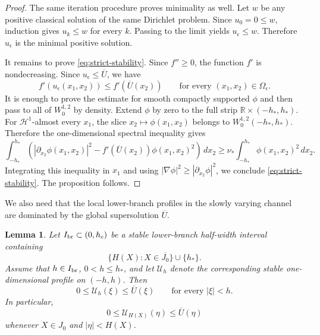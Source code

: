 \documentclass[reqno,12pt]{amsart}
\numberwithin{equation}{section}
\newtheorem{lemma}[theorem]{Lemma}
\theoremstyle{remark}
\begin{document}
\begin{proof}
The same iteration procedure proves minimality as well. Let $w$ be any positive classical
solution of the same Dirichlet problem. Since $u_0=0\le w$, induction gives
$u_k\le w$ for every $k$. Passing to the limit yields
$u_\epsilon\le w$. Therefore $u_\epsilon$ is the minimal positive solution.

It remains to prove \eqref{eq:strict-stability}. Since $f''\ge0$, the function
$f'$ is nondecreasing. Since $u_\epsilon\le \overline U$, we have
$$
f'(u_\epsilon(x_1,x_2))\le f'(\overline U(x_2))
\qquad\text{for every }(x_1,x_2)\in\Omega_\epsilon.
$$
It is enough to prove the estimate for smooth compactly supported
$\phi$ and then pass to all of $W_0^{1,2}$ by density. Extend $\phi$ by zero to
the full strip $\mathbb R\times(-h_*,h_*)$. For $\mathcal H^1$-almost every $x_1$, the slice
$x_2\mapsto \phi(x_1,x_2)$ belongs to $W_0^{1,2}(-h_*,h_*)$. Therefore the
one-dimensional spectral inequality gives
$$
\int_{-h_*}^{h_*}
\left( |\partial_{x_2}\phi(x_1,x_2)|^2-f'(\overline U(x_2))\phi(x_1,x_2)^2\right)\,dx_2
\ge
\nu_*\int_{-h_*}^{h_*}\phi(x_1,x_2)^2\,dx_2.
$$
Integrating this inequality in $x_1$ and using $|\nabla\phi|^2\ge
|\partial_{x_2}\phi|^2$, we conclude \eqref{eq:strict-stability}. The proposition follows.
\end{proof}

We also need that the local lower-branch profiles in the slowly varying channel are dominated by the global supersolution $\overline U$.

\begin{lemma}\label{lem:profile-domination}
Let $I_{\rm br} \subset (0, h_c)$ be a stable lower-branch half-width interval containing
$$
\{H(X):X\in\overline{J_0}\}\cup\{h_*\}.
$$
Assume that $h\in I_{\rm br}$, $0<h\le h_*$, and let $\mathcal U_h$ denote the corresponding stable
one-dimensional profile on $(-h,h)$. Then
$$
0\le\mathcal  U_h(\xi)\le \overline U(\xi)
\qquad\text{for every } |\xi|<h.
$$
In particular,
$$
0\le \mathcal U_{H(X)}(\eta)\le \overline U(\eta)
$$
whenever $X\in J_0$ and $|\eta|<H(X)$.
\end{lemma}
\end{document}
